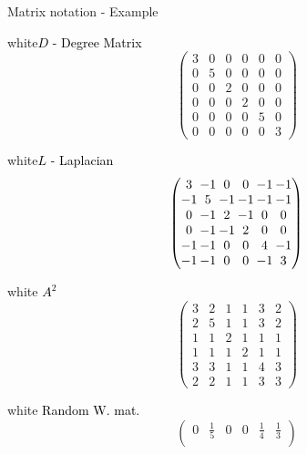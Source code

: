 \begin{textbox}{Matrix notation - Example}
\begin{multibox}{2}
    \begin{subbox}{white}{\textcolor{black}{$D$ - Degree Matrix}}
      \centering
      \footnotesize
      \[\begin{pmatrix}
          3 & 0 & 0 & 0 & 0 & 0 \\
          0 & 5 & 0 & 0 & 0 & 0 \\
          0 & 0 & 2 & 0 & 0 & 0 \\
          0 & 0 & 0 & 2 & 0 & 0 \\
          0 & 0 & 0 & 0 & 5 & 0 \\
          0 & 0 & 0 & 0 & 0 & 3
        \end{pmatrix}
      \]
    \end{subbox}
    \begin{subbox}{white}{\textcolor{black}{$L$ - Laplacian }}
      \centering
      \footnotesize
      \[
        \setlength\arraycolsep{1pt}
        \begin{pmatrix}
          3  & -1 & 0  & 0  & -1 & -1 \\
          -1 & 5  & -1 & -1 & -1 & -1 \\
          0  & -1 & 2  & -1 & 0  & 0  \\
          0  & -1 & -1 & 2  & 0  & 0  \\
          -1 & -1 & 0  & 0  & 4  & -1 \\
          -1 & -1 & 0  & 0  & -1 & 3
        \end{pmatrix}
      \]
    \end{subbox}
    \begin{subbox}{white}{\textcolor{black}{ $A^2$}}
      \centering
      \footnotesize
      \[\begin{pmatrix}
          3 & 2 & 1 & 1 & 3 & 2 \\
          2 & 5 & 1 & 1 & 3 & 2 \\
          1 & 1 & 2 & 1 & 1 & 1 \\
          1 & 1 & 1 & 2 & 1 & 1 \\
          3 & 3 & 1 & 1 & 4 & 3 \\
          2 & 2 & 1 & 1 & 3 & 3
        \end{pmatrix}
      \]
    \end{subbox}
    \begin{subbox}{white}{\textcolor{black}{ Random W. mat.}}
      \centering
      \footnotesize
      \setlength\arraycolsep{3pt}
      \[\begin{pmatrix}
          0           & \frac{1}{5} & 0           & 0           & \frac{1}{4} & \frac{1}{3} \\[6pt]

\end{pmatrix}\]
\end{subbox}
\end{multibox}
\end{textbox}
